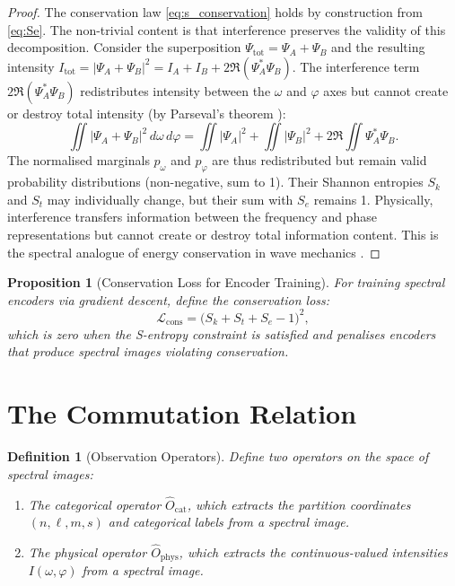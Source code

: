\documentclass[11pt,twocolumn,a4paper]{article}
\newtheorem{proposition}[theorem]{Proposition}
\newtheorem{definition}[theorem]{Definition}
\newcommand{\Ocat}{\hat{O}_{\mathrm{cat}}}
\newcommand{\Ophys}{\hat{O}_{\mathrm{phys}}}
\newcommand{\Sk}{S_k}
\newcommand{\St}{S_t}
\newcommand{\Se}{S_e}
\begin{document}
\begin{proof}
The conservation law \eqref{eq:s_conservation} holds by construction
from \eqref{eq:Se}. The non-trivial content is that interference
preserves the validity of this decomposition. Consider the superposition
$\Psi_{\text{tot}} = \Psi_A + \Psi_B$ and the resulting intensity
$I_{\text{tot}} = |\Psi_A + \Psi_B|^2 =
I_A + I_B + 2\Re(\Psi_A^* \Psi_B)$.
The interference term $2\Re(\Psi_A^* \Psi_B)$ redistributes intensity
between the $\omega$ and $\varphi$ axes but cannot create or destroy
total intensity (by Parseval's theorem \citep{fourier1822}):
\begin{equation}
  \iint |\Psi_A + \Psi_B|^2 \, d\omega \, d\varphi =
  \iint |\Psi_A|^2 + \iint |\Psi_B|^2 + 2\Re\iint \Psi_A^*\Psi_B.
\end{equation}
The normalised marginals $p_\omega$ and $p_\varphi$ are thus
redistributed but remain valid probability distributions (non-negative,
sum to 1). Their Shannon entropies $\Sk$ and $\St$ may individually
change, but their sum with $\Se$ remains 1. Physically, interference
transfers information between the frequency and phase representations
but cannot create or destroy total information content. This is the
spectral analogue of energy conservation in wave mechanics
\citep{born1999}.
\end{proof}

\begin{proposition}[Conservation Loss for Encoder Training]
\label{prop:conservation_loss}
For training spectral encoders via gradient descent, define the
conservation loss:
\begin{equation}
\label{eq:conservation_loss}
  \mathcal{L}_{\text{cons}} = \bigl(\Sk + \St + \Se - 1\bigr)^2,
\end{equation}
which is zero when the S-entropy constraint is satisfied and penalises
encoders that produce spectral images violating conservation.
\end{proposition}


\section{The Commutation Relation}
\label{sec:commutation}

\begin{definition}[Observation Operators]
\label{def:operators}
Define two operators on the space of spectral images:
\begin{enumerate}[label=(\roman*),nosep]
  \item The \emph{categorical operator} $\Ocat$, which extracts the
    partition coordinates $(n, \ell, m, s)$ and categorical labels from
    a spectral image.
  \item The \emph{physical operator} $\Ophys$, which extracts the
    continuous-valued intensities $I(\omega, \varphi)$ from a
    spectral image.
\end{enumerate}
\end{definition}
\end{document}
